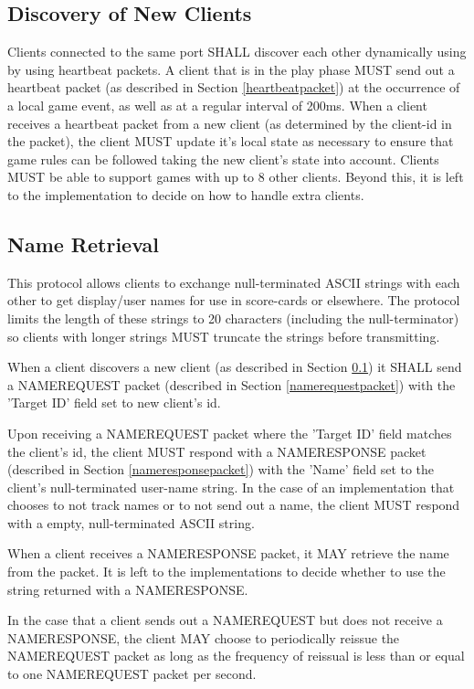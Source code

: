 \documentclass[11pt]{article} %
\begin{document}
\subsection{Discovery of New Clients}
\label{discovery}
Clients connected to the same port SHALL discover each other dynamically using by
using heartbeat packets. A client that is in the play phase MUST send out a
heartbeat packet (as described in Section \ref{heartbeatpacket}) at the
occurrence of a local game event, as well as at a regular interval of 200ms. 
When a client receives a heartbeat packet from a new 
client (as determined by the client-id in the packet), the client MUST update
it's local state as necessary to ensure that game rules can be followed taking
the new client's state into account. 
	Clients MUST be able to support games with up to 8 other clients. Beyond
this, it is left to the implementation to decide on how to handle extra clients.

\subsection{Name Retrieval}
\label{nameretrieval}
This protocol allows clients to exchange null-terminated ASCII strings with each
other to get display/user names for use in score-cards or elsewhere. The
protocol limits the length of these strings to 20 characters (including the
null-terminator) so clients with longer strings MUST truncate the strings before
transmitting.

When a client discovers a new client (as described in Section \ref{discovery})
it SHALL send a NAMEREQUEST packet (described in Section \ref{namerequestpacket}) 
with the 'Target ID' field set to new client's id. 

Upon receiving a NAMEREQUEST packet where the 'Target ID' field matches the
client's id, the client MUST respond with a NAMERESPONSE packet (described in Section
\ref{nameresponsepacket}) with the 'Name'
field set to the client's null-terminated user-name string. In the case of an
implementation that chooses to not track names or to not send out a name, the
client MUST respond with a empty, null-terminated ASCII string. 

When a client receives a NAMERESPONSE packet, it MAY retrieve the name from the
packet. It is left to the implementations to decide whether to use the string 
returned with a NAMERESPONSE.

In the case that a client sends out a NAMEREQUEST but does not receive a
NAMERESPONSE, the client MAY choose to periodically reissue the NAMEREQUEST
packet as long as the frequency of reissual is less than or equal to one
NAMEREQUEST packet per second.
\end{document}
